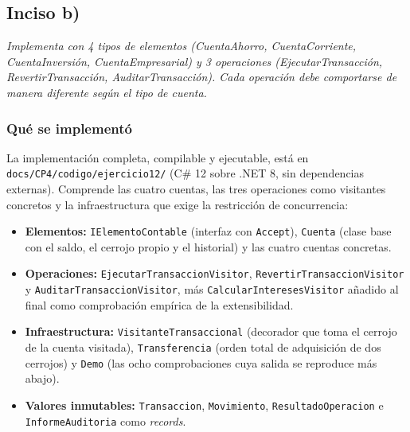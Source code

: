 {}
\subsection*{Inciso b)}

\sloppy

\textit{Implementa con 4 tipos de elementos (CuentaAhorro, CuentaCorriente, CuentaInversión,
CuentaEmpresarial) y 3 operaciones (EjecutarTransacción, RevertirTransacción,
AuditarTransacción). Cada operación debe comportarse de manera diferente según el tipo de
cuenta.}

\vspace{0.4cm}

\subsubsection*{Qué se implementó}

La implementación completa, compilable y ejecutable, está en
\texttt{docs/CP4/codigo/ejercicio12/} (C\# 12 sobre .NET 8, sin dependencias
externas). Comprende las
cuatro cuentas, las tres operaciones como visitantes concretos y la infraestructura que exige
la restricción de concurrencia:

\begin{itemize}[leftmargin=1.2cm]
    \item \textbf{Elementos:} \texttt{IElementoContable} (interfaz con \texttt{Accept}),
          \texttt{Cuenta} (clase base con el saldo, el cerrojo propio y el historial) y las
          cuatro cuentas concretas.
    \item \textbf{Operaciones:} \texttt{EjecutarTransaccionVisitor},
          \texttt{RevertirTransaccionVisitor} y \texttt{AuditarTransaccionVisitor}, más
          \texttt{CalcularInteresesVisitor} añadido al final como comprobación empírica de la
          extensibilidad.
    \item \textbf{Infraestructura:} \texttt{VisitanteTransaccional} (decorador que toma el
          cerrojo de la cuenta visitada), \texttt{Transferencia} (orden total de adquisición
          de dos cerrojos) y \texttt{Demo} (las ocho comprobaciones cuya salida se reproduce
          más abajo).
    \item \textbf{Valores inmutables:} \texttt{Transaccion}, \texttt{Movimiento},
          \texttt{ResultadoOperacion} e \texttt{InformeAuditoria} como \textit{records}.
\end{itemize}

